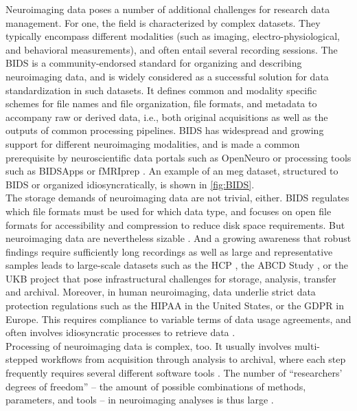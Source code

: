 Neuroimaging data poses a number of additional challenges for research data management.
For one, the field is characterized by complex datasets.
They typically encompass different modalities (such as imaging, electro-physiological, and behavioral measurements), and often entail several recording sessions.
The \gls{BIDS} \citep{gorgolewski2016brain} is a community-endorsed standard for organizing and describing neuroimaging data, and is widely considered as a successful solution for data standardization in such datasets.
It defines common and modality specific schemes for file names and file organization, file formats, and metadata to accompany raw  or derived data, i.e., both original acquisitions as well as the outputs of common processing pipelines.
\gls{BIDS} has widespread and growing support for different neuroimaging modalities, and is made a common prerequisite by neuroscientific data portals such as OpenNeuro \citep{markiewicz2021openneuro} or processing tools such as BIDSApps \citep{gorgolewski2017bids} or fMRIprep \citep{esteban2019fmriprep}.
An example of an \gls{meg} dataset, structured to \gls{BIDS} or organized idiosyncratically, is shown in \cref{fig:BIDS}. \\
The storage demands of neuroimaging data are not trivial, either.
\gls{BIDS} regulates which file formats must be used for which data type, and focuses on open file formats for accessibility and compression to reduce disk space requirements.
But neuroimaging data are nevertheless sizable \citep{van2014human}.
And a growing awareness that robust findings require sufficiently long recordings \citep{li2021moving} as well as large and representative samples \citep{button2013power, turner2018small} leads to large-scale datasets such as the \gls{HCP} \citep{van2013wu}, the \gls{ABCD} Study \citep{casey2018adolescent}, or the \gls{UKB} project \citep{matthews2015uk} that pose infrastructural challenges for storage, analysis, transfer and archival.
Moreover, in human neuroimaging, data underlie strict data protection regulations such as the \gls{HIPAA} in the United States, or the \gls{GDPR} in Europe.
This requires compliance to variable terms of data usage agreements, and often involves idiosyncratic processes to retrieve data \citep{waitedata}.\\
Processing of neuroimaging data is complex, too.
It usually involves multi-stepped workflows from acquisition through analysis to archival, where each step frequently requires several different software tools \citep{poline2011, NISO2022119623}.
The number of ``researchers' degrees of freedom'' -- the amount of possible combinations of methods, parameters, and tools -- in neuroimaging analyses is thus large \citep{bowring2019exploring}.
